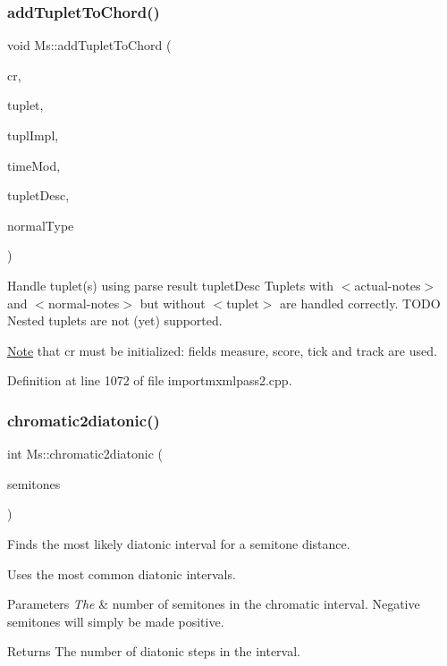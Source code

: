 \subsubsection{\texorpdfstring{add\+Tuplet\+To\+Chord()}{addTupletToChord()}}
{\footnotesize\ttfamily void Ms\+::add\+Tuplet\+To\+Chord (\begin{DoxyParamCaption}\item[{\hyperlink{class_ms_1_1_chord_rest}{Chord\+Rest} $\ast$}]{cr,  }\item[{\hyperlink{class_ms_1_1_tuplet}{Tuplet} $\ast$\&}]{tuplet,  }\item[{bool \&}]{tupl\+Impl,  }\item[{const \hyperlink{class_ms_1_1_fraction}{Fraction} \&}]{time\+Mod,  }\item[{const \hyperlink{struct_ms_1_1_music_xml_tuplet_desc}{Music\+Xml\+Tuplet\+Desc} \&}]{tuplet\+Desc,  }\item[{const \hyperlink{class_ms_1_1_t_duration}{T\+Duration}}]{normal\+Type }\end{DoxyParamCaption})}

Handle tuplet(s) using parse result tuplet\+Desc Tuplets with $<$actual-\/notes$>$ and $<$normal-\/notes$>$ but without $<$tuplet$>$ are handled correctly. T\+O\+DO Nested tuplets are not (yet) supported.

\hyperlink{class_ms_1_1_note}{Note} that cr must be initialized\+: fields measure, score, tick and track are used. 

Definition at line 1072 of file importmxmlpass2.\+cpp.

\mbox{\label{namespace_ms_a6cdf049ca0474b5b8d301da33d6873dd}} 
\subsubsection{\texorpdfstring{chromatic2diatonic()}{chromatic2diatonic()}}
{\footnotesize\ttfamily int Ms\+::chromatic2diatonic (\begin{DoxyParamCaption}\item[{int}]{semitones }\end{DoxyParamCaption})}

Finds the most likely diatonic interval for a semitone distance.

Uses the most common diatonic intervals.


\begin{DoxyParams}{Parameters}
{\em The} & number of semitones in the chromatic interval. Negative semitones will simply be made positive.\\
\hline
\end{DoxyParams}
\begin{DoxyReturn}{Returns}
The number of diatonic steps in the interval. 
\end{DoxyReturn}


